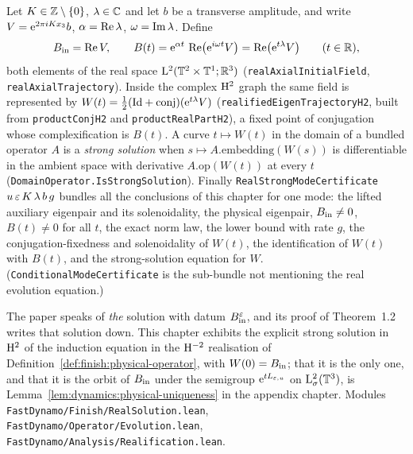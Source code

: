 \begin{definition}
  \label{def:finish:real-solution}
  \leanok
  Let $K\in\mathbb{Z}\setminus\{0\}$, $\lambda\in\mathbb{C}$ and let $b$ be a transverse amplitude, and write
  $V=\mathrm{e}^{2\pi iKx_3}b$, $\alpha=\operatorname{Re}\lambda$, $\omega=\operatorname{Im}\lambda$.  Define
  \[
    B_{\rm in}=\operatorname{Re} V,
    \qquad
    B(t)=\mathrm{e}^{\alpha t}\,\operatorname{Re}\bigl(\mathrm{e}^{i\omega t}V\bigr)
    =\operatorname{Re}\bigl(\mathrm{e}^{t\lambda}V\bigr)
    \qquad(t\in\mathbb{R}),
  \]
  both elements of the real space $\mathrm{L}^2(\mathbb{T}^2\times\mathbb{T}^1;\mathbb{R}^3)$
  (\texttt{realAxialInitialField}, \texttt{realAxialTrajectory}).  Inside the complex $\mathrm{H}^2$ graph
  the same field is represented by $W(t)=\frac12(\mathrm{Id}+\mathrm{conj})(\mathrm{e}^{t\lambda}V)$
  (\texttt{realifiedEigenTrajectoryH2}, built from \texttt{productConjH2} and
  \texttt{productRealPartH2}), a fixed point of conjugation whose complexification is $B(t)$.  A
  curve $t\mapsto W(t)$ in the domain of a bundled operator $A$ is a \emph{strong solution} when
  $s\mapsto A.\text{embedding}(W(s))$ is differentiable in the ambient space with derivative
  $A.\text{op}(W(t))$ at every $t$ (\texttt{DomainOperator.IsStrongSolution}).  Finally
  \texttt{RealStrongModeCertificate}~$u\,\varepsilon\,K\,\lambda\,b\,g$ bundles all the conclusions of
  this chapter for one mode: the lifted auxiliary eigenpair and its solenoidality, the physical
  eigenpair, $B_{\rm in}\neq0$, $B(t)\neq0$ for all $t$, the exact norm law, the lower bound with
  rate $g$, the conjugation-fixedness and solenoidality of $W(t)$, the identification of $W(t)$
  with $B(t)$, and the strong-solution equation for $W$.  (\texttt{ConditionalModeCertificate} is
  the sub-bundle not mentioning the real evolution equation.)
\end{definition}

The paper speaks of \emph{the} solution with datum $B_{\rm in}^\varepsilon$, and its proof of
Theorem~1.2 writes that solution down.  This chapter exhibits the explicit strong solution in
$\mathrm{H}^2$ of the induction equation in the $\mathrm{H}^{-2}$ realisation of
Definition~\ref{def:finish:physical-operator}, with $W(0)=B_{\rm in}$; that it is the only one,
and that it is the orbit of $B_{\rm in}$ under the semigroup $\mathrm{e}^{tL_{\varepsilon,u}}$ on
$\mathrm{L}^2_\sigma(\mathbb{T}^3)$, is Lemma~\ref{lem:dynamics:physical-uniqueness} in the appendix chapter.
Modules \texttt{FastDynamo/Finish/RealSolution.lean}, \texttt{FastDynamo/Operator/Evolution.lean},
\texttt{FastDynamo/Analysis/Realification.lean}.

